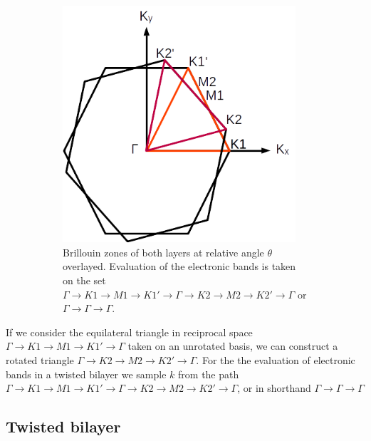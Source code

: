 \documentclass[12pt]{report} %
\begin{document}
\begin{figure}[t]
\begin{subfigure}[t]{0.45\textwidth}
    \includegraphics[width=0.95\textwidth]{heterostructure_BZ_path.png}
    \caption{
      Brillouin zones of both layers at relative angle $\theta$ overlayed. Evaluation of the electronic bands is taken on the set $\Gamma \rightarrow K1 \rightarrow M1 \rightarrow K1' \rightarrow \Gamma \rightarrow K2 \rightarrow M2 \rightarrow K2' \rightarrow \Gamma$ or $\Gamma \rightarrow \Gamma \rightarrow \Gamma$.
    }
    \label{heterostructure_BZ_path}
  \end{subfigure}
  \caption{
  }
\end{figure}

  If we consider the equilateral triangle in reciprocal space $\Gamma \rightarrow K1 \rightarrow M1 \rightarrow K1' \rightarrow \Gamma$ taken on an unrotated basis, we can construct a rotated triangle $\Gamma \rightarrow K2 \rightarrow M2 \rightarrow K2' \rightarrow \Gamma$. For the the evaluation of electronic bands in a twisted bilayer we sample $k$ from the path $\Gamma \rightarrow K1 \rightarrow M1 \rightarrow K1' \rightarrow \Gamma \rightarrow K2 \rightarrow M2 \rightarrow K2' \rightarrow \Gamma$, or in shorthand $\Gamma \rightarrow \Gamma \rightarrow \Gamma$

\subsection*{Twisted bilayer}
\end{document}
